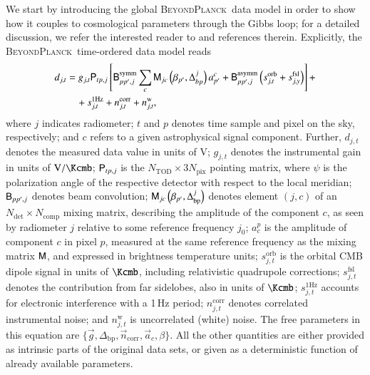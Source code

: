 \documentclass[twocolumn]{aa}
\newcommand{\n}[0]{\vec{n}}
\renewcommand{\a}[0]{\vec{a}}
\newcommand{\B}[0]{\tens{B}}
\newcommand{\g}[0]{\vec{g}}
\newcommand{\M}[0]{\tens{M}}
\renewcommand{\P}[0]{\tens{P}}
\newcommand{\BP}{\textsc{BeyondPlanck}}
\begin{document}
We start by introducing the global \BP\ data model in order to
show how it couples to cosmological parameters through the Gibbs loop;
for a detailed discussion, we refer the interested reader to
\citet{bp01} and references therein. Explicitly, the \BP\ time-ordered
data model reads
\begin{equation}
  \label{eq:data_model}
  \begin{split}
  d_{j,t} &= g_{j,t}{\P}_{tp,j}\left[ {\B}_{pp',j}^{\mathrm{symm}} \sum_c 
  {\M}_{jc}\left(\beta_{p'},\Delta_{bp}^j\right) a_{p'}^c +{\B}_{pp',j}^{\mathrm{asymm}}
  \left(s_{j,t}^{\mathrm{orb}}+s_{j,y}^{\mathrm{fsl}}\right)\right] + \\
  & \quad + s_{j,t}^{\mathrm{1Hz}} + n_{j,t}^{\mathrm{corr}}+n_{j,t}^{\mathrm{w}},
  \end{split}
\end{equation}
where $j$ indicates radiometer; $t$ and $p$ denotes time sample and
pixel on the sky, respectively; and $c$ refers to a given
astrophysical signal component. Further, $d_{j,t}$ denotes the
measured data value in units of $\si{\volt}$; $g_{j,t}$ denotes the
instrumental gain in units of $\si{\volt\per\Kcmb}$; $\P_{tp,j}$ is
the $N_{\mathrm{TOD}}\times 3N_{\mathrm{pix}}$ pointing matrix, where
$\psi$ is the polarization angle of the respective detector with
respect to the local meridian; $\B_{pp',j}$ denotes beam convolution;
$\M_{jc}\left(\beta_{p'},\Delta_{\mathrm{bp}}^j\right)$ denotes
element $(j,c)$ of an $N_{\mathrm{det}}\times N_{\mathrm{comp}}$
mixing matrix, describing the amplitude of the component $c$, as seen
by radiometer $j$ relative to some reference frequency $j_0$; $a_c^p$
is the amplitude of component $c$ in pixel $p$, measured at the same
reference frequency as the mixing matrix $\M$, and expressed in
brightness temperature units; $s_{j,t}^{\mathrm{orb}}$ is the orbital
CMB dipole signal in units of $\si{\Kcmb}$, including relativistic
quadrupole corrections; $s_{j,t}^{\mathrm{fsl}}$ denotes the
contribution from far sidelobes, also in units of $\si{\Kcmb}$;
$s_{j,t}^{\mathrm{1Hz}}$ accounts for electronic interference with a
1\,Hz period; $n_{j,t}^{\mathrm{corr}}$ denotes correlated
instrumental noise; and $n_{j,t}^{\mathrm{w}}$ is uncorrelated (white)
noise. The free parameters in this equation are
$\lbrace\g,\Delta_{\mathrm{bp}},\n_{\mathrm{corr}},\a_c,\beta\rbrace$. All
the other quantities are either provided as intrinsic parts of the
original data sets, or given as a deterministic function of already
available parameters.
\end{document}
